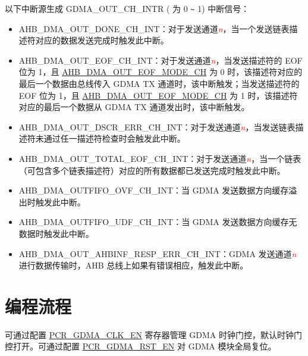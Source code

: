 \documentclass[main\_\_CN.tex]{subfiles}
\begin{document}
以下中断源生成 GDMA\_OUT\_CH\_INTR ( 为 0 \verb+~+ 1) 中断信号：

\begin{itemize}
    \item \label{int:GDMAOUTDONEINT}AHB\_DMA\_OUT\_DONE\_CH\_INT：对于发送通道\textcolor{red}{\it{n}}，当一个发送链表描述符对应的数据发送完成时触发此中断。
    \item \label{int:GDMAOUTEOFINT}AHB\_DMA\_OUT\_EOF\_CH\_INT：对于发送通道\textcolor{red}{\it{n}}，当发送描述符的 EOF 位为 1，且 \hyperref[fielddesc:AHBDMAOUTEOFMODECHN]{AHB\_DMA\_OUT\_EOF\_MODE\_CH} 为 0 时，该描述符对应的最后一个数据由总线传入 GDMA TX 通道时，该中断触发；当发送描述符的 EOF 位为 1，且 \hyperref[fielddesc:AHBDMAOUTEOFMODECHN]{AHB\_DMA\_OUT\_EOF\_MODE\_CH} 为 1 时，该描述符对应的最后一个数据从 GDMA TX 通道发出时，该中断触发。
    \item \label{int:GDMAOUTDSCRERRINT}AHB\_DMA\_OUT\_DSCR\_ERR\_CH\_INT：对于发送通道\textcolor{red}{\it{n}}，当发送链表描述符未通过任一描述符检查时会触发此中断。
    \item \label{int:GDMAOUTTOTALEOFINT}AHB\_DMA\_OUT\_TOTAL\_EOF\_CH\_INT：对于发送通道\textcolor{red}{\it{n}}，当一个链表（可包含多个链表描述符）对应的所有数据都已发送完成时触发此中断。
    \item \label{int:GDMAOUTFIFOOVFINT} AHB\_DMA\_OUTFIFO\_OVF\_CH\_INT：当 GDMA 发送数据方向缓存溢出时触发此中断。
    \item \label{int:GDMAOUTFIFOUDFINT}AHB\_DMA\_OUTFIFO\_UDF\_CH\_INT：当 GDMA 发送数据方向缓存无数据时触发此中断。
    \item \label{int:GDMAOUTAHBINFRESPERRINT}AHB\_DMA\_OUT\_AHBINF\_RESP\_ERR\_CH\_INT：GDMA 发送通道\textcolor{red}{\it{n}} 进行数据传输时，AHB 总线上如果有错误相应，触发此中断。
\end{itemize}


\section{编程流程}

可通过配置 \hyperref[fielddesc:PCRGDMACLKEN]{PCR\_GDMA\_CLK\_EN} 寄存器管理 GDMA 时钟门控，默认时钟门控打开。可通过配置 \hyperref[fielddesc:PCRGDMARSTEN]{PCR\_GDMA\_RST\_EN} 对 GDMA 模块全局复位。
\end{document}
